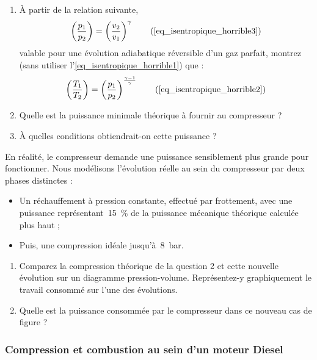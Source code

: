 	\begin{enumerate}
		\item À partir de la relation suivante,
			\begin{equation}
				\left( \frac{p_1}{p_2} \right)	= \left( \frac{v_2}{v_1} \right)^{\gamma} \tag{\ref{eq_isentropique_horrible3}}
			\end{equation}
			valable pour une évolution adiabatique réversible d’un gaz parfait, montrez (sans utiliser l’\cref{eq_isentropique_horrible1}) que :			
			\begin{equation}
				\left( \frac{T_1}{T_2} \right)	=  \left( \frac{p_1}{p_2} \right)^{\frac{\gamma -1}{\gamma}}  \tag{\ref{eq_isentropique_horrible2}}
			\end{equation}
		\item Quelle est la puissance minimale théorique à fournir au compresseur ?
		\item À quelles conditions obtiendrait-on cette puissance ?
	\end{enumerate}
	
	En réalité, le compresseur demande une puissance sensiblement plus grande pour fonctionner. Nous modélisons l’évolution réelle au sein du compresseur par deux phases distinctes :

	\begin{itemize}
		\item Un réchauffement à pression constante, effectué par frottement, avec une puissance représentant~\SI{15}{\percent} de la puissance mécanique théorique calculée plus haut ;
		\item Puis, une compression idéale jusqu’à~\SI{8}{\bar}.
	\end{itemize}
	
	\begin{enumerate}
		\item Comparez la compression théorique de la question 2 et cette nouvelle évolution sur un diagramme pression-volume. Représentez-y graphiquement le travail consommé sur l’une des évolutions.
		\item Quelle est la puissance consommée par le compresseur dans ce nouveau cas de figure ?
	\end{enumerate}


\subsubsection{Compression et combustion au sein d’un moteur Diesel}
\label{exo_compression_combustion_diesel}

